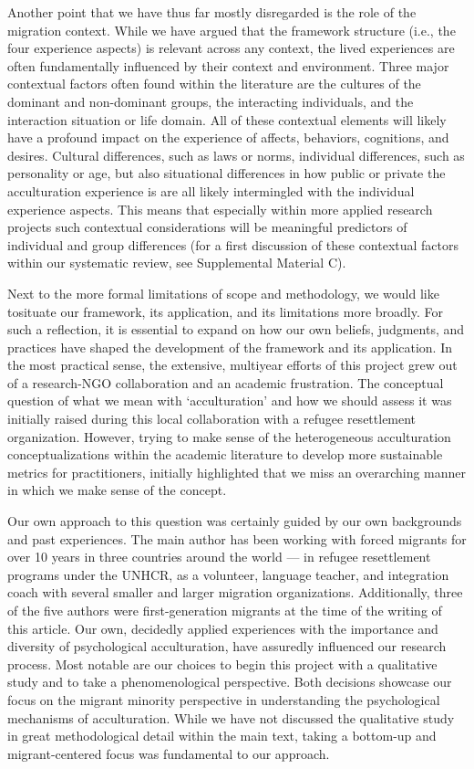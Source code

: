 \documentclass[man, 12pt, a4paper, mask]{apa7}
\begin{document}
Another point that we have thus far mostly disregarded is the role of the migration context. While we have argued that the framework structure (i.e., the four experience aspects) is relevant across any context, the lived experiences are often fundamentally influenced by their context and environment. Three major contextual factors often found within the literature are the cultures of the dominant and non-dominant groups, the interacting individuals, and the interaction situation or life domain. All of these contextual elements will likely have a profound impact on the experience of affects, behaviors, cognitions, and desires. Cultural differences, such as laws or norms, individual differences, such as personality or age, but also situational differences in how public or private the acculturation experience is are all likely intermingled with the individual experience aspects. This means that especially within more applied research projects such contextual considerations will be meaningful predictors of individual and group differences (for a first discussion of these contextual factors within our systematic review, see Supplemental Material C). 

Next to the more formal limitations of scope and methodology, we would like tosituate our framework, its application, and its limitations more broadly. For such a reflection, it is essential to expand on how our own beliefs, judgments, and practices have shaped the development of the framework and its application. In the most practical sense, the extensive, multiyear efforts of this project grew out of a research-NGO collaboration and an academic frustration. The conceptual question of what we mean with `acculturation' and how we should assess it was initially raised during this local collaboration with a refugee resettlement organization. However, trying to make sense of the heterogeneous acculturation conceptualizations within the academic literature to develop more sustainable metrics for practitioners, initially highlighted that we miss an overarching manner in which we make sense of the concept. 

Our own approach to this question was certainly guided by our own backgrounds and past experiences. The main author has been working with forced migrants for over 10 years in three countries around the world --- in refugee resettlement programs under the UNHCR, as a volunteer, language teacher, and integration coach with several smaller and larger migration organizations. Additionally, three of the five authors were first-generation migrants at the time of the writing of this article. Our own, decidedly applied experiences with the importance and diversity of psychological acculturation, have assuredly influenced our research process. Most notable are our choices to begin this project with a qualitative study and to take a phenomenological perspective. Both decisions showcase our focus on the migrant minority perspective in understanding the psychological mechanisms of acculturation. While we have not discussed the qualitative study in great methodological detail within the main text, taking a bottom-up and migrant-centered focus was fundamental to our approach.
\end{document}
